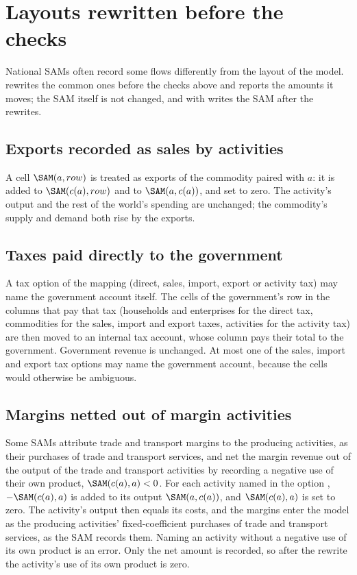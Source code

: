 \section{Layouts rewritten before the checks}\label{sec:layouts}

National SAMs often record some flows differently from the layout of the
model.  rewrites the common ones before the checks above and
reports the amounts it moves; the SAM itself is not changed, and
 with  writes the SAM after the rewrites.

\subsection{Exports recorded as sales by activities}

A cell $\SAM(a, row)$ is treated as exports of the commodity paired with
$a$: it is added to $\SAM(c(a), row)$ and to $\SAM(a, c(a))$, and set to zero.
The activity's output and the rest of the world's spending are unchanged; the
commodity's supply and demand both rise by the exports.

\subsection{Taxes paid directly to the government}

A tax option of the mapping (direct, sales, import, export or activity tax)
may name the government account itself. The cells of the government's row in
the columns that pay that tax (households and enterprises for the direct tax,
commodities for the sales, import and export taxes, activities for the
activity tax) are then moved to an internal tax account, whose column pays
their total to the government. Government revenue is unchanged. At most one of
the sales, import and export tax options may name the government account,
because the cells would otherwise be ambiguous.

\subsection{Margins netted out of margin activities}

Some SAMs attribute trade and transport margins to the producing activities,
as their purchases of trade and transport services, and net the margin
revenue out of the output of the trade and transport activities by recording
a negative use of their own product, $\SAM(c(a), a) < 0$. For each activity
named in the option , $-\SAM(c(a), a)$ is added to its output
$\SAM(a, c(a))$, and $\SAM(c(a), a)$ is set to zero. The activity's output
then equals its costs, and the margins enter the model as the producing
activities' fixed-coefficient purchases of trade and transport services, as
the SAM records them. Naming an activity without a negative use of its own
product is an error. Only the net amount is recorded, so after the rewrite the
activity's use of its own product is zero.

